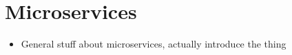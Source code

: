 \section{Microservices}

\begin{itemize}
\item General stuff about microservices, actually introduce the thing
\end{itemize}
